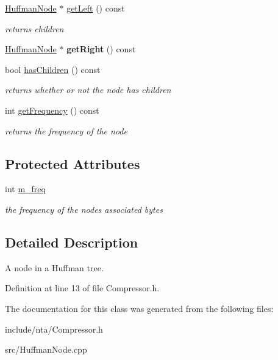 \begin{DoxyCompactItemize}
\hyperlink{classnta_1_1HuffmanNode}{Huffman\+Node} $\ast$ \hyperlink{classnta_1_1HuffmanNode_a2f67fd062ac5079cd40a0a82352d5a45}{get\+Left} () const
\begin{DoxyCompactList}\small\item\em returns children \end{DoxyCompactList}\item 
\mbox{\label{classnta_1_1HuffmanNode_a3be8400f944090f38c48b17e890e5105}} 
\hyperlink{classnta_1_1HuffmanNode}{Huffman\+Node} $\ast$ {\bfseries get\+Right} () const
\item 
\mbox{\label{classnta_1_1HuffmanNode_a429374a0e433063935f6e86816be8831}} 
bool \hyperlink{classnta_1_1HuffmanNode_a429374a0e433063935f6e86816be8831}{has\+Children} () const
\begin{DoxyCompactList}\small\item\em returns whether or not the node has children \end{DoxyCompactList}\item 
\mbox{\label{classnta_1_1HuffmanNode_aaae7f78797726f30ce584e6fd0a282c1}} 
int \hyperlink{classnta_1_1HuffmanNode_aaae7f78797726f30ce584e6fd0a282c1}{get\+Frequency} () const
\begin{DoxyCompactList}\small\item\em returns the frequency of the node \end{DoxyCompactList}\end{DoxyCompactItemize}
\subsection*{Protected Attributes}
\begin{DoxyCompactItemize}
\item 
\mbox{\label{classnta_1_1HuffmanNode_acba67dc4c5cda81fa4f761a314b57d86}} 
int \hyperlink{classnta_1_1HuffmanNode_acba67dc4c5cda81fa4f761a314b57d86}{m\+\_\+freq}
\begin{DoxyCompactList}\small\item\em the frequency of the nodes associated bytes \end{DoxyCompactList}\end{DoxyCompactItemize}


\subsection{Detailed Description}
A node in a Huffman tree. 

Definition at line 13 of file Compressor.\+h.



The documentation for this class was generated from the following files\+:\begin{DoxyCompactItemize}
\item 
include/nta/Compressor.\+h\item 
src/Huffman\+Node.\+cpp\end{DoxyCompactItemize}
